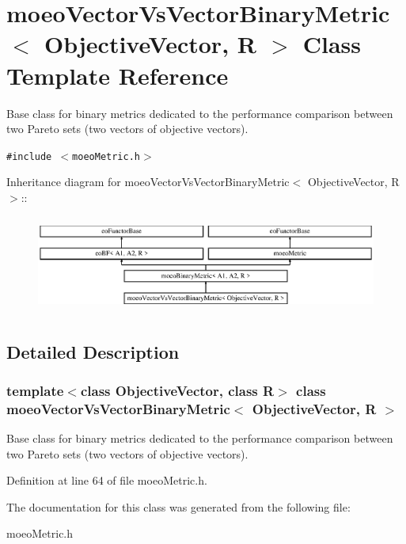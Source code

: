 \section{moeo\-Vector\-Vs\-Vector\-Binary\-Metric$<$ Objective\-Vector, R $>$ Class Template Reference}
\label{classmoeoVectorVsVectorBinaryMetric}
Base class for binary metrics dedicated to the performance comparison between two Pareto sets (two vectors of objective vectors).  


{\tt \#include $<$moeo\-Metric.h$>$}

Inheritance diagram for moeo\-Vector\-Vs\-Vector\-Binary\-Metric$<$ Objective\-Vector, R $>$::\begin{figure}[H]
\begin{center}
\leavevmode
\includegraphics[height=3.22767cm]{classmoeoVectorVsVectorBinaryMetric}
\end{center}
\end{figure}


\subsection{Detailed Description}
\subsubsection*{template$<$class Objective\-Vector, class R$>$ class moeo\-Vector\-Vs\-Vector\-Binary\-Metric$<$ Objective\-Vector, R $>$}

Base class for binary metrics dedicated to the performance comparison between two Pareto sets (two vectors of objective vectors). 



Definition at line 64 of file moeo\-Metric.h.

The documentation for this class was generated from the following file:\begin{CompactItemize}
\item 
moeo\-Metric.h\end{CompactItemize}
